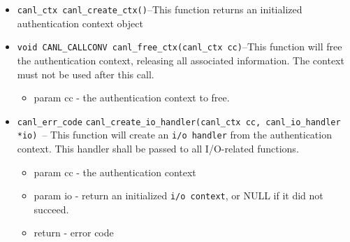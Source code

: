 \begin{itemize}
  \item \verb'canl_ctx canl_create_ctx()'--This function
  returns an initialized authentication context object
  \item \verb'void CANL_CALLCONV canl_free_ctx(canl_ctx cc)'--This
  function will free the authentication context, releasing 
  all associated information.  The context must not be used after this call.
  \begin{itemize}
    \item param cc - the authentication context to free.
  \end{itemize}
  \item \verb'canl_err_code'
  \verb'canl_create_io_handler(canl_ctx cc, canl_io_handler *io)' -- 
  This function will create an \verb'i/o handler' from the authentication 
  context. This handler shall be passed to all I/O-related functions.
  \begin{itemize}
    \item param cc - the authentication context
    \item param io -  return an initialized \verb'i/o context', or NULL if 
    it did not succeed.
    \item return - \CANL error code
  \end{itemize}


\end{itemize}
